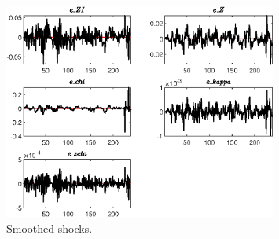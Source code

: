  
\begin{figure}[H]
\centering 
\includegraphics[width=0.80\textwidth]{directed_search_est_alt_obs/graphs/directed_search_est_alt_obs_SmoothedShocks1}
\caption{Smoothed shocks.}\label{Fig:SmoothedShocks:1}
\end{figure}


